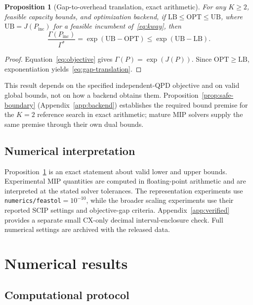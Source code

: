 \documentclass[
  aps,
  pra,
  reprint,
  amsmath,
  amssymb,
  longbibliography,
  nofootinbib,
  floatfix
]{revtex4-2}
\theoremstyle{plain}
\newtheorem{proposition}{Proposition}
\newcommand{\OPT}{\mathrm{OPT}}
\newcommand{\LB}{\mathrm{LB}}
\newcommand{\UB}{\mathrm{UB}}
\begin{document}
\begin{proposition}[Gap-to-overhead translation, exact arithmetic]\label{prop:gap}
For any $K\geq2$, feasible capacity bounds, and optimization backend, if $\LB\leq\OPT\leq\UB$, where $\UB=J(P_{\mathrm{inc}})$ for a feasible incumbent of~\eqref{eq:kway}, then
\begin{equation}
  \frac{\Gamma(P_{\mathrm{inc}})}{\Gamma^*}
  = \exp(\UB-\OPT) \leq \exp(\UB-\LB).
  \label{eq:gap-translation}
\end{equation}
\end{proposition}
\begin{proof}
Equation~\eqref{eq:objective} gives $\Gamma(P)=\exp(J(P))$. Since $\OPT\geq\LB$, exponentiation yields~\eqref{eq:gap-translation}.
\end{proof}

This result depends on the specified independent-QPD objective and on valid global bounds, not on how a backend obtains them. Proposition~\ref{prop:safe-boundary} (Appendix~\ref{app:backend}) establishes the required bound premise for the $K=2$ reference search in exact arithmetic; mature MIP solvers supply the same premise through their own dual bounds.

\subsection{Numerical interpretation}
\label{sec:num-semantics}

Proposition~\ref{prop:gap} is an exact statement about valid lower and upper bounds. Experimental MIP quantities are computed in floating-point arithmetic and are interpreted at the stated solver tolerances. The representation experiments use \texttt{numerics/feastol}$=10^{-10}$, while the broader scaling experiments use their reported SCIP settings and objective-gap criteria. Appendix~\ref{app:verified} provides a separate small CX-only decimal interval-enclosure check. Full numerical settings are archived with the released data.

\section{Numerical results}
\label{sec:results}

\subsection{Computational protocol}
\label{sec:protocol}
\end{document}
